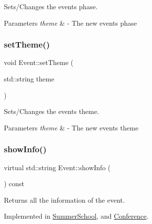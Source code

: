 Sets/\+Changes the event\textquotesingle{}s phase. 


\begin{DoxyParams}{Parameters}
{\em theme} & -\/ The new event\textquotesingle{}s phase \\
\hline
\end{DoxyParams}
\mbox{\label{classEvent_abdd2c869f0231002c2a16813923586fb}} 
\subsubsection{\texorpdfstring{set\+Theme()}{setTheme()}}
{\footnotesize\ttfamily void Event\+::set\+Theme (\begin{DoxyParamCaption}\item[{std\+::string}]{theme }\end{DoxyParamCaption})}



Sets/\+Changes the event\textquotesingle{}s theme. 


\begin{DoxyParams}{Parameters}
{\em theme} & -\/ The new event\textquotesingle{}s theme \\
\hline
\end{DoxyParams}
\mbox{\label{classEvent_aaa38f467e933c57190d43351bdb817be}} 
\subsubsection{\texorpdfstring{show\+Info()}{showInfo()}}
{\footnotesize\ttfamily virtual std\+::string Event\+::show\+Info (\begin{DoxyParamCaption}{ }\end{DoxyParamCaption}) const\hspace{0.3cm}{\ttfamily [pure virtual]}}



Returns all the information of the event. 



Implemented in \mbox{\hyperlink{classSummerSchool_a61ac7307840f787e3de639d431248e26}{Summer\+School}}, and \mbox{\hyperlink{classConference_a7a2f7b38c728f487d82356d3c671ef88}{Conference}}.



